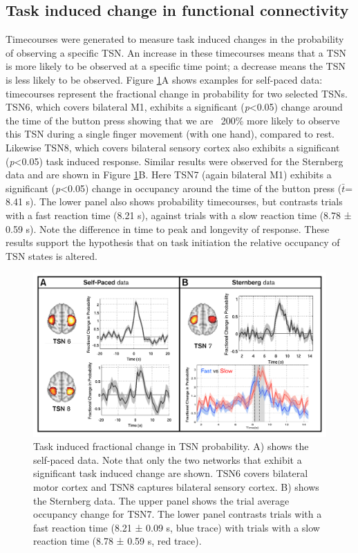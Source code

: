 \subsection{Task induced change in functional connectivity}
Timecourses were generated to measure task induced changes in the probability of observing a specific TSN. An increase in these timecourses means that a TSN is more likely to be observed at a specific time point; a decrease means the TSN is less likely to be observed. Figure \ref{figure_5_5}A shows examples for self-paced data: timecourses represent the fractional change in probability for two selected TSNs. TSN6, which covers bilateral M1, exhibits a significant (\textit{p}<0.05) change around the time of the button press showing that we are ~200\% more likely to observe this TSN during a single finger movement (with one hand), compared to rest. Likewise TSN8, which covers bilateral sensory cortex also exhibits a significant (\textit{p}<0.05) task induced response. Similar results were observed for the Sternberg data and are shown in Figure \ref{figure_5_5}B. Here TSN7 (again bilateral M1) exhibits a significant (\textit{p}<0.05) change in occupancy around the time of the button press ($\bar{t}$= 8.41 s). The lower panel also shows probability timecourses, but contrasts trials with a fast reaction time (8.21 s), against trials with a slow reaction time (8.78 ± 0.59 s). Note the difference in time to peak and longevity of response. These results support the hypothesis that on task initiation the relative occupancy of TSN states is altered. 

\begin{figure}[h]
	\begin{center}
		\includegraphics[width=\linewidth]{./images/chapter5/Figure_5.png}
		\caption{Task induced fractional change in TSN probability. A) shows the self-paced data. Note that only the two networks that exhibit a significant task induced change are shown. TSN6 covers bilateral motor cortex and TSN8 captures bilateral sensory cortex. B) shows the Sternberg data. The upper panel shows the trial average occupancy change for TSN7. The lower panel contrasts trials with a fast reaction time (8.21 ± 0.09 s, blue trace) with trials with a slow reaction time (8.78 ± 0.59 s, red trace). \label{figure_5_5}}
	\end{center}
\end{figure}


